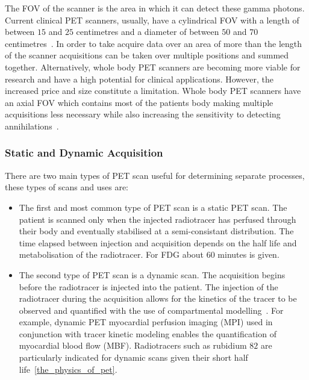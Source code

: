             The \gls{FOV} of the scanner is the area in which it can detect these gamma photons. Current clinical \gls{PET} scanners, usually, have a cylindrical \gls{FOV} with a length of between $15$ and $25$ centimetres and a diameter of between $50$ and $70$ centimetres~. In order to take acquire data over an area of more than the length of the scanner acquisitions can be taken over multiple positions and summed together. Alternatively, whole body \gls{PET} scanners are becoming more viable for research and have a high potential for clinical applications. However, the increased price and size constitute a limitation. Whole body \gls{PET} scanners have an axial \gls{FOV} which contains most of the patients body making multiple acquisitions less necessary while also increasing the sensitivity to detecting annihilations~.
            
            \subsubsection{Static and Dynamic Acquisition} \label{static_and_dynamic_acquisition}
                There are two main types of \gls{PET} scan useful for determining separate processes, these types of scans and uses are:
                
                \begin{itemize}
                    \item The first and most common type of \gls{PET} scan is a static \gls{PET} scan. The patient is scanned only when the injected radiotracer has perfused through their body and eventually stabilised at a semi-consistant distribution. The time elapsed between injection and acquisition depends on the half life and metabolisation of the radiotracer. For \gls{FDG} about $60$ minutes is given.
                    
                    \item The second type of \gls{PET} scan is a dynamic scan. The acquisition begins before the radiotracer is injected into the patient. The injection of the radiotracer during the acquisition allows for the kinetics of the tracer to be observed and quantified with the use of compartmental modelling~. For example, dynamic PET myocardial perfusion imaging (MPI) used in conjunction with tracer kinetic modeling enables the quantification of myocardial blood flow (MBF). Radiotracers such as rubidium $82$ are particularly indicated for dynamic scans given their short half life~\ref{the_physics_of_pet}.
                \end{itemize}
            
